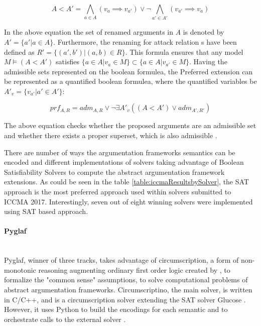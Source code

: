 \begin{equation}
A < A' = \bigwedge\limits_{a \in A} (v_a \implies v_{a'}) \lor \neg \bigwedge\limits_{a' \in A'} (v_{a'} \implies v_a)
\end{equation}

In the above equation the set of renamed arguments in \textit{A} is denoted by $A' = \{a' | a \in A\}$. Furthermore, the renaming for attack relation s have been defined as $R' = \{(a',b') | (a,b) \in R\}$. This formula ensures that any model $ M \models (A < A')$ satisfies $ \{a \in A | v_a \in M\} \subset \{a \in A | v_{a'} \in M\} $. Having the admissible sets represented on the boolean formulea, the Preferred extension can be represented as a quantified boolean formulea, where the quantified variables be $ A'_v = \{v_{a'} | a' \in A'\} $:

\begin{equation}
prf_{A,R} = adm_{A,R} \lor \neg \exists A'_v ((A < A') \lor adm_{A',R'})
\end{equation}

The above equation checks whether the proposed arguments are an admissible set and whether there exists a proper superset, which is also admissible \citep{solvingMethods}.

There are number of ways the argumentation frameworks semantics can be encoded and different implementations of solvers taking advantage of Boolean Satisfiability Solvers to compute the abstract argumentation framework extensions. As could be seen in the table \ref{table:iccmaResultsbySolver}, the SAT approach is the most preferred approach used within solvers submitted to ICCMA 2017. Interestingly, seven out of eight winning solvers were implemented using SAT based approach. 

\paragraph{Pyglaf} \mbox{}\\ 
Pyglaf, winner of three tracks, takes advantage of circumscription, a form of non-monotonic reasoning augmenting ordinary first order logic created by \citet{circumpscription}, to formalize the "common sense" assumptions, to solve computational problems of abstract argumentation frameworks.  Circumscriptino, the main solver, is written in C/C++, and is a circumscription solver extending the SAT solver Glucose \citep{glucose}. However, it uses Python to build the encodings for each semantic and to orchestrate calls to the external solver \citep{pyglaf}. 

